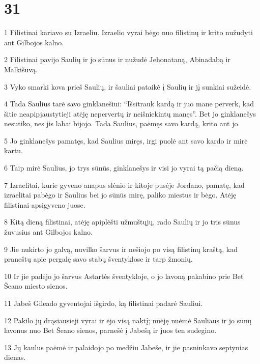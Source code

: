 \chapter{31}


\par 1 Filistinai kariavo su Izraeliu. Izraelio vyrai bėgo nuo filistinų ir krito nužudyti ant Gilbojos kalno. 
\par 2 Filistinai pavijo Saulių ir jo sūnus ir nužudė Jehonataną, Abinadabą ir Malkišūvą. 
\par 3 Vyko smarki kova prieš Saulių, ir šauliai pataikė į Saulių ir jį sunkiai sužeidė. 
\par 4 Tada Saulius tarė savo ginklanešiui: “Išsitrauk kardą ir juo mane perverk, kad šitie neapipjaustytieji atėję nepervertų ir neišniekintų manęs”. Bet jo ginklanešys nesutiko, nes jis labai bijojo. Tada Saulius, paėmęs savo kardą, krito ant jo. 
\par 5 Jo ginklanešys pamatęs, kad Saulius miręs, irgi puolė ant savo kardo ir mirė kartu. 
\par 6 Taip mirė Saulius, jo trys sūnūs, ginklanešys ir visi jo vyrai tą pačią dieną. 
\par 7 Izraelitai, kurie gyveno anapus slėnio ir kitoje pusėje Jordano, pamatę, kad izraelitai pabėgo ir Saulius bei jo sūnūs mirę, paliko miestus ir bėgo. Atėję filistinai apsigyveno juose. 
\par 8 Kitą dieną filistinai, atėję apiplėšti užmuštųjų, rado Saulių ir jo tris sūnus žuvusius ant Gilbojos kalno. 
\par 9 Jie nukirto jo galvą, nuvilko šarvus ir nešiojo po visą filistinų kraštą, kad praneštų apie pergalę savo stabų šventyklose ir tarp žmonių. 
\par 10 Ir jie padėjo jo šarvus Astartės šventykloje, o jo lavoną pakabino prie Bet Šeano miesto sienos. 
\par 11 Jabeš Gileado gyventojai išgirdo, ką filistinai padarė Sauliui. 
\par 12 Pakilo jų drąsiausieji vyrai ir ėjo visą naktį; nuėję nuėmė Sauliaus ir jo sūnų lavonus nuo Bet Šeano sienos, parnešė į Jabešą ir juos ten sudegino. 
\par 13 Jų kaulus paėmė ir palaidojo po medžiu Jabeše, ir jie pasninkavo septynias dienas.



